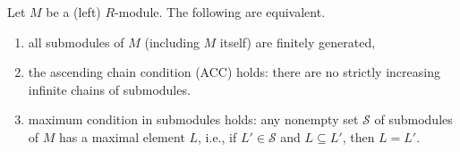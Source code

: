 Let $M$ be a (left) $R$-module. The following are equivalent.
\begin{enumerate}[label=(\roman*)]
	\item all submodules of $M$ (including $M$ itself) are finitely generated,
	\item the ascending chain condition (ACC) holds: there are no strictly
		increasing infinite chains of submodules.
	\item maximum condition in submodules holds: any nonempty set $\mathcal{S}$ of
		submodules of $M$ has a maximal element $L$, i.e., if $L' \in \mathcal{S}$ and
		$L \subseteq L'$, then $L = L'$.
\end{enumerate}
